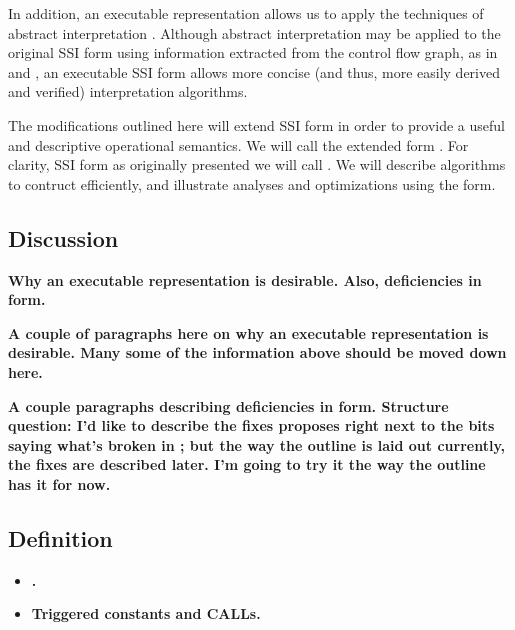\documentclass[12pt,titlepage,twoside]{article}
\begin{document}
In addition, an executable representation allows us to apply the
techniques of abstract interpretation \cite{idunno}.  Although abstract
interpretation may be applied to the original SSI form using
information extracted from the control flow graph, as in \cite{foo}
and \cite{bar}, an executable SSI form allows more concise (and thus,
more easily derived and verified) interpretation
algorithms.

The modifications outlined here will extend SSI form in order to
provide a useful and descriptive operational semantics.  We will call
the extended form \ssiplus.  For clarity, SSI form as originally
presented we will call \ssizero.  We will describe algorithms to
contruct \ssiplus{} efficiently, and illustrate analyses and
optimizations using the form.

\subsection{Discussion}
\textbf{Why an executable representation is desirable.  Also,
deficiencies in \ssizero{} form.}

\textbf{A couple of paragraphs here on why an executable
representation is desirable.  Many some of the information above
should be moved down here.}

\textbf{A couple paragraphs describing deficiencies in \ssizero{} form.
Structure question: I'd like to describe the fixes \ssiplus{} proposes
right next to the bits saying what's broken in \ssizero{}; but the way
the outline is laid out currently, the fixes are described later.  I'm
going to try it the way the outline has it for now.}

\subsection{Definition}
\begin{itemize}
\item \textbf{.}
\item \textbf{Triggered constants and CALLs.}
\end{itemize}
\end{document}
